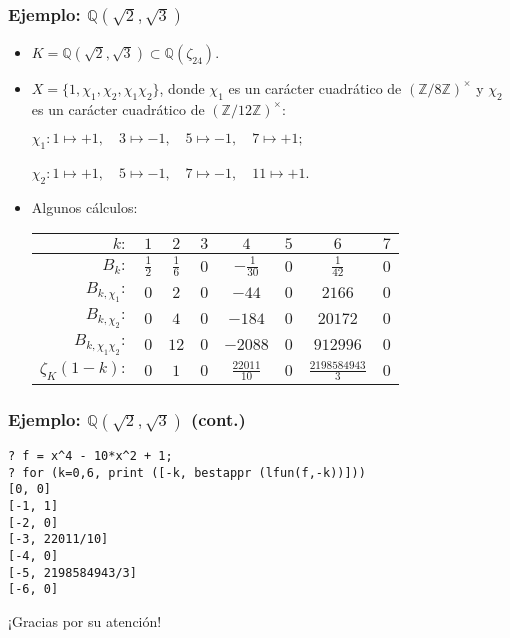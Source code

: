 \documentclass{beamer}
\newcommand{\ZZ}{\mathbb{Z}}
\newcommand{\QQ}{\mathbb{Q}}
\begin{document}

\begin{frame}
  \frametitle{Ejemplo: $\QQ (\sqrt{2},\sqrt{3})$}

  \begin{itemize}
  \item<1-> $K = \QQ (\sqrt{2},\sqrt{3}) \subset \QQ (\zeta_{24})$.

  \item<2-> $X = \{ 1, \chi_1, \chi_2, \chi_1\chi_2 \}$, donde $\chi_1$ es un carácter
    cuadrático de $(\ZZ/8\ZZ)^\times$ y $\chi_2$ es un carácter cuadrático de
    $(\ZZ/12\ZZ)^\times$:

    $\chi_1\colon 1 \mapsto +1, \quad
    3\mapsto -1, \quad
    5\mapsto -1, \quad
    7\mapsto +1;$

    $\chi_2\colon 1 \mapsto +1, \quad
    5\mapsto -1, \quad
    7\mapsto -1, \quad
    11\mapsto +1$.

  \item<3-> Algunos cálculos:

    \begin{center}\small
      \renewcommand{\arraystretch}{1.5}
    \begin{tabular}{rccccccc}
      \hline
      $k\colon$ & $1$ & $2$ & $3$ & $4$ & $5$ & $6$ & $7$ \\
      \hline
      $B_k\colon$ & $\frac{1}{2}$ & $\frac{1}{6}$ & $0$ & $-\frac{1}{30}$ & $0$ & $\frac{1}{42}$ & $0$ \\
      \hline
      $B_{k,\chi_1}\colon$ & $0$ & $2$ & $0$ & $-44$ & $0$ & $2166$ & $0$ \\
      \hline
      $B_{k,\chi_2}\colon$ & $0$ & $4$ & $0$ & $-184$ & $0$ & $20172$ & $0$ \\
      \hline
      $B_{k,\chi_1 \chi_2}\colon$ & $0$ & $12$ & $0$ & $-2088$ & $0$ & $912996$ & $0$ \\
      \hline
      $\zeta_K (1-k)\colon$ & $0$ & $1$ & $0$ & $\frac{22011}{10}$ & $0$ & $\frac{2198584943}{3}$ & $0$ \\
      \hline
    \end{tabular}
  \end{center}
  \end{itemize}
\end{frame}


\begin{frame}[fragile]
  \frametitle{Ejemplo: $\QQ (\sqrt{2},\sqrt{3})$ (cont.)}

  \begin{shaded}\small
\begin{verbatim}
? f = x^4 - 10*x^2 + 1;
? for (k=0,6, print ([-k, bestappr (lfun(f,-k))]))
[0, 0]
[-1, 1]
[-2, 0]
[-3, 22011/10]
[-4, 0]
[-5, 2198584943/3]
[-6, 0]
\end{verbatim}
\end{shaded}
\end{frame}


\begin{frame}[plain]
  \headingfont

  \begin{center}
    {\huge ¡Gracias por su atención!}
  \end{center}
\end{frame}
\end{document}
